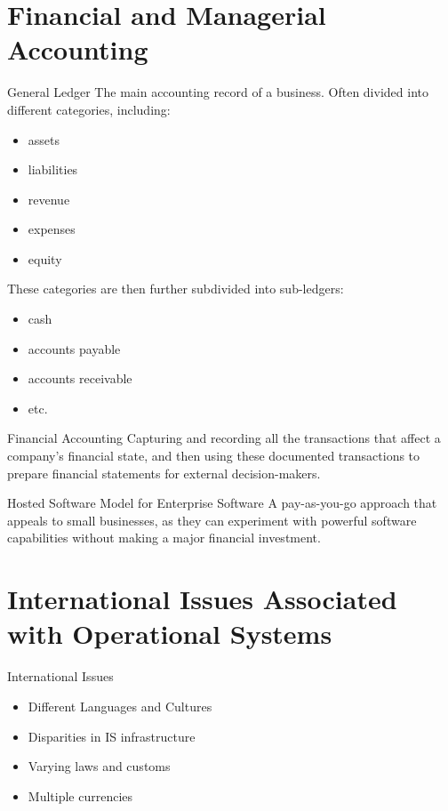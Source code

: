 \documentclass[\main/notes.tex]{subfiles}
\begin{document}
		\pagebreak
		\section{Financial and Managerial Accounting}
			\begin{definition}{General Ledger}
				The main accounting record of a business. Often divided into different categories, including:
				\begin{multicols}{2}
					\begin{itemize}[nosep]
						\item assets
						\item liabilities
						\item revenue
						\item expenses
						\item equity
					\end{itemize}
				\end{multicols}
				These categories are then further subdivided into sub-ledgers:
				\begin{multicols}{2}
					\begin{itemize}[nosep]
						\item cash
						\item accounts payable
						\item accounts receivable
						\item etc.
					\end{itemize}
				\end{multicols}
			\end{definition}
			\begin{definition}{Financial Accounting}
				Capturing and recording all the transactions that affect a company's financial state, and then using these documented transactions to prepare financial statements for external decision-makers.
			\end{definition}
			\begin{sidenote}{Hosted Software Model for Enterprise Software}
				A pay-as-you-go approach that appeals to small businesses, as they can experiment with powerful software capabilities without making a major financial investment.
			\end{sidenote}

		\section{International Issues Associated with Operational Systems}
			\begin{sidenote}{International Issues}
				\begin{itemize}
					\item Different Languages and Cultures
					\item Disparities in IS infrastructure
					\item Varying laws and customs
					\item Multiple currencies
				\end{itemize}
			\end{sidenote}
\end{document}
